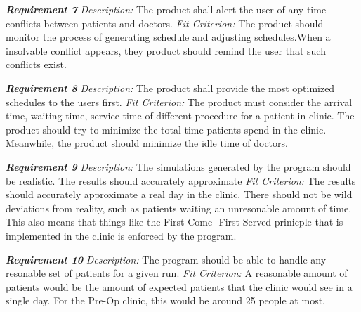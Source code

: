 \documentclass[12pt, titlepage]{article}
\begin{document}
\noindent\textbf{\textit{Requirement 7}}\newline
\textit{Description:}\newline
The product shall alert the user of any time conflicts between patients and doctors. \newline\newline
\textit{Fit Criterion:}\newline 
The product should monitor the process of generating schedule and adjusting schedules.When a insolvable conflict appears, they product should remind the user that such conflicts exist. \newline

\noindent\textbf{\textit{Requirement 8}}\newline
\textit{Description:}\newline
The product shall provide the most optimized schedules to the users first. \newline\newline
\textit{Fit Criterion:}\newline 
The product must consider the  arrival time, waiting time, service time of different procedure for a patient in clinic. The product should try to minimize the total time patients spend in the clinic. Meanwhile, the product should minimize the idle time of doctors. \newline

\noindent\textbf{\textit{Requirement 9}}\newline
\textit{Description:}\newline
The simulations generated by the program should be realistic. The results should accurately approximate
 \newline\newline
\textit{Fit Criterion:}\newline 
The results should accurately approximate a real day in the clinic. There should not be wild deviations from reality, such as patients waiting an unresonable amount of time. This also means that things like the First Come- First Served prinicple that is implemented in the clinic is enforced by the program. \newline

\noindent\textbf{\textit{Requirement 10}}\newline
\textit{Description:}\newline
The program should be able to handle any resonable set of patients for a given run.
\newline\newline
\textit{Fit Criterion:}\newline 
A reasonable amount of patients would be the amount of expected patients that the clinic would see in a single day. For the Pre-Op clinic, this would be around 25 people at most.  \newline
\end{document}
